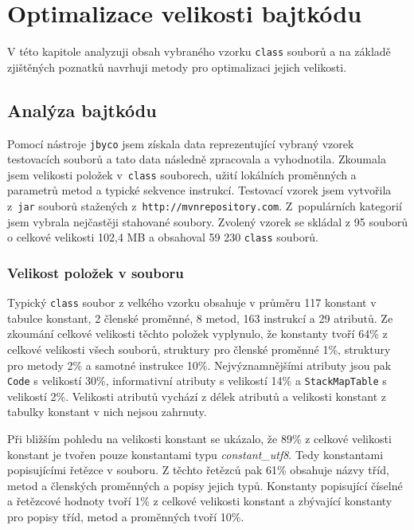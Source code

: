 \chapter{Optimalizace velikosti bajtkódu}\label{Tool}

V této kapitole analyzuji obsah vybraného vzorku \texttt{class} souborů a na základě zjištěných poznatků navrhuji metody pro optimalizaci jejich velikosti. 

\section{Analýza bajtkódu}\label{Analysis}

Pomocí nástroje \texttt{jbyco} jsem získala data reprezentující vybraný vzorek testovacích souborů a tato data následně zpracovala a vyhodnotila. Zkoumala jsem velikosti položek v~\texttt{class} souborech, užití lokálních proměnných a parametrů metod a typické sekvence instrukcí. Testovací vzorek jsem vytvořila z~\texttt{jar} souborů stažených z~\texttt{http://mvnrepository.com}. Z~populárních kategorií jsem vybrala nejčastěji stahované soubory. Zvolený vzorek se skládal z 95 souborů o celkové velikosti 102,4 MB a obsahoval 59 230 \texttt{class} souborů.

\subsection{Velikost položek v souboru}

Typický \texttt{class} soubor z velkého vzorku obsahuje v průměru 117 konstant v tabulce konstant, 2 členské proměnné, 8 metod, 163 instrukcí a 29 atributů. Ze zkoumání celkové velikosti těchto položek vyplynulo, že konstanty tvoří 64\% z celkové velikosti všech souborů, struktury pro členské proměnné 1\%, struktury pro metody 2\% a samotné instrukce 10\%.
Nejvýznamnějšími atributy jsou pak \texttt{Code} s velikostí 30\%, informativní atributy s velikostí 14\% a \texttt{StackMapTable} s velikostí 2\%. Velikosti atributů vychází z délek atributů a velikosti konstant z tabulky konstant v nich nejsou zahrnuty.

Při bližším pohledu na velikosti konstant se ukázalo, že 89\% z celkové velikosti konstant je tvořen pouze konstantami typu \textit{constant\_utf8}. Tedy konstantami popisujícími řetězce v souboru. Z těchto řetězců pak 61\% obsahuje názvy tříd, metod a členských proměnných a popisy jejich typů. Konstanty popisující číselné a řetězcové hodnoty tvoří 1\% z celkové velikosti konstant a zbývající konstanty pro popisy tříd, metod a proměnných tvoří 10\%.

